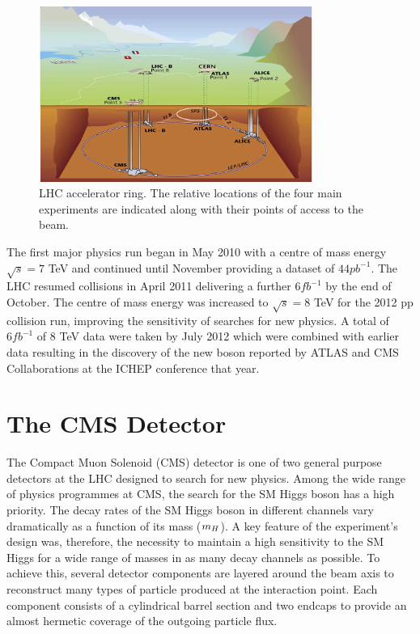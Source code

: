 \begin{figure}[htb!]
\begin{center}
\includegraphics[width=0.8\textwidth]{detector/CERN.jpg}
\caption{LHC accelerator ring. The relative locations of the four main experiments 
are indicated along with their points of access to the beam.}
\label{fig:lhcring}
\end{center}
\end{figure}

The first major physics run began in May 2010 with a centre of mass energy 
$\sqrt{s}=7$ TeV and continued until November providing a dataset of $44pb^{-1}$.
The LHC resumed collisions in April 2011 delivering a further $6fb^{-1}$ by the end
of October. The centre of mass energy was increased to $\sqrt{s}=8$ TeV for the 2012 pp 
collision run, improving the sensitivity of searches for new physics. A total of
$6fb^{-1}$ of 8 TeV data were taken by July 2012 which were combined with earlier data resulting
in the discovery of the new boson reported by ATLAS and CMS Collaborations at the ICHEP conference that year. 

\section{The CMS Detector}
\label{sec:cmsdetector}
The Compact Muon Solenoid (CMS) detector is one of two general purpose detectors at 
the LHC designed to search for new physics. 
Among the wide range of physics programmes at CMS, the search for the SM Higgs boson 
has a high priority. The decay rates of the SM Higgs boson in different 
channels vary dramatically as a function of its mass ($m_{H}$). A key feature of the experiment's design
was, therefore, the necessity to maintain a high sensitivity to the SM Higgs for a wide range of masses in as many 
decay channels as possible. To achieve this, several detector components are layered around 
the beam axis to reconstruct many types of particle produced at the interaction point.
Each component consists of a cylindrical barrel section and two endcaps 
to provide an almost hermetic coverage of the outgoing particle flux.


